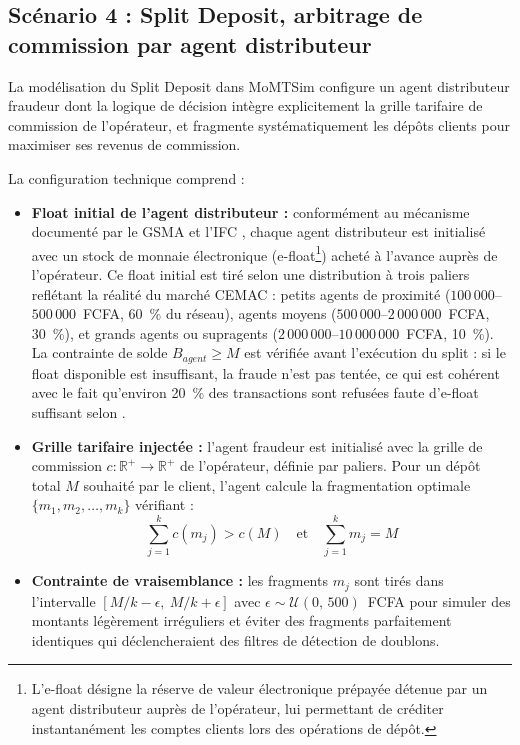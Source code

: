 \documentclass[11pt,a4paper,oneside]{report}
\theoremstyle{definition}
\theoremstyle{remark}
\begin{document}
\subsection{Scénario 4 : Split Deposit, arbitrage de commission par agent distributeur}

La modélisation du Split Deposit dans MoMTSim configure un agent distributeur fraudeur dont la logique de décision intègre explicitement la grille tarifaire de commission de l'opérateur, et fragmente systématiquement les dépôts clients pour maximiser ses revenus de commission.

La configuration technique comprend :

\begin{itemize}
    \item \textbf{Float initial de l'agent distributeur :} conformément au mécanisme documenté par le GSMA \citep{gsma2010agents} et l'IFC \citep{ifc2017liquidity}, chaque agent distributeur est initialisé avec un stock de monnaie électronique (e-float\footnote{L'e-float désigne la réserve de valeur électronique prépayée détenue par un agent distributeur auprès de l'opérateur, lui permettant de créditer instantanément les comptes clients lors des opérations de dépôt.}) acheté à l'avance auprès de l'opérateur. Ce float initial est tiré selon une distribution à trois paliers reflétant la réalité du marché CEMAC : petits agents de proximité ($100\,000$--$500\,000$~FCFA, 60~\% du réseau), agents moyens ($500\,000$--$2\,000\,000$~FCFA, 30~\%), et grands agents ou supragents ($2\,000\,000$--$10\,000\,000$~FCFA, 10~\%). La contrainte de solde $B_{agent} \geq M$ est vérifiée avant l'exécution du split : si le float disponible est insuffisant, la fraude n'est pas tentée, ce qui est cohérent avec le fait qu'environ 20~\% des transactions sont refusées faute d'e-float suffisant selon \citet{cogent2023agent}.

    \item \textbf{Grille tarifaire injectée :} l'agent fraudeur est initialisé avec la grille de commission $c : \mathbb{R}^+ \rightarrow \mathbb{R}^+$ de l'opérateur, définie par paliers. Pour un dépôt total $M$ souhaité par le client, l'agent calcule la fragmentation optimale $\{m_1, m_2, \ldots, m_k\}$ vérifiant :
    \begin{equation}
        \sum_{j=1}^{k} c(m_j) > c(M) \quad \text{et} \quad \sum_{j=1}^{k} m_j = M
    \end{equation}

    \item \textbf{Contrainte de vraisemblance :} les fragments $m_j$ sont tirés dans l'intervalle $[M/k - \epsilon,\ M/k + \epsilon]$ avec $\epsilon \sim \mathcal{U}(0,\, 500)$~FCFA pour simuler des montants légèrement irréguliers et éviter des fragments parfaitement identiques qui déclencheraient des filtres de détection de doublons.


\end{itemize}
\end{document}
